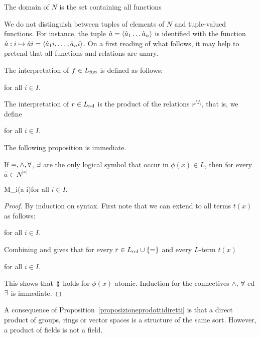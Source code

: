 The domain of $N$ is the set containing all functions

\smallskip


We do not distinguish between tuples of elements of $N$ and tuple-valued functions. For instance, the tuple $\hat a=\langle\hat a_1\dots\hat a_n\rangle$ is identified with the function $\hat a:i\mapsto\hat ai=\langle\hat a_1i,\dots,\hat a_ni\rangle$. On a first reading of what follows, it may help to pretend that all functions and relations are unary.

The interpretation of $f\in L_{\rm fun}$ is defined as follows:

\hfill  for all $i\in I$.

The interpretation of $r\in L_{\rm rel}$ is the product of the relations $r^{M_i}$, that is, we define

\hfill  for all $i\in I$.


The following proposition is immediate.

\begin{proposition}\label{proposizioneprodottidiretti}
If $=, \wedge, \forall$, $\exists$ are the only logical symbol that occur in $\phi(x)\in L$, then for every $\hat a\in N^{|x|}$

{\IFF}
{M_i\models\phi(\hat a i)}\hfill for all $i\in I$.

\end{proposition}

\begin{proof}
By induction on syntax. First note that we can extend  to all terms $t(x)$ as follows:

\hfill  for all $i\in I$. 

Combining  and  gives that for every $r\in L_{\rm rel}\cup\{=\}$ and every $L$-term $t(x)$

\hfill  for all $i\in I$.

This shows that $\,\sharp\,$ holds for $\phi(x)$ atomic. Induction for the connectives $\wedge$, $\forall$ ed $\exists$ is immediate.
\end{proof}

A consequence of Proposition~\ref{proposizioneprodottidiretti} is that a direct product of groups, rings or vector spaces is a structure of the same sort. However, a product of fields is not a field.

